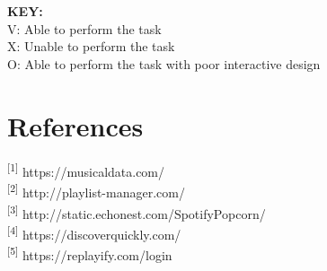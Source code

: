 \documentclass[letter, 11pt]{article}
\begin{document}
\textbf{KEY:}\\
\indent
V: Able to perform the task \\
\indent
X: Unable to perform the task \\
\indent
O: Able to perform the task with poor interactive design

\section*{References}

\noindent
{\textsuperscript{[1]} https://musicaldata.com/} \\
{\textsuperscript{[2]} http://playlist-manager.com/} \\
{\textsuperscript{[3]} http://static.echonest.com/SpotifyPopcorn/}\\
{\textsuperscript{[4]} https://discoverquickly.com/}\\
{\textsuperscript{[5]} https://replayify.com/login}
\end{document}
